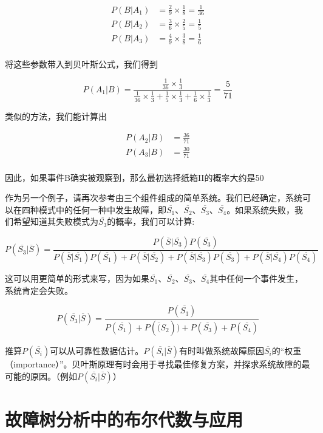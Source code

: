 \documentclass[cn,11pt,chinese]{elegantbook}
\begin{document}
\begin{align*}
P(B|A_1)&=\frac{2}{9}\times\frac{1}{8}=\frac{1}{36} \\
P(B|A_2)&=\frac{3}{6}\times\frac{2}{5}=\frac{1}{5}  \\
P(B|A_3)&=\frac{4}{9}\times\frac{3}{8}=\frac{1}{6}  \\
\end{align*}

将这些参数带入到贝叶斯公式，我们得到

$$
P(A_1|B)=\frac{\frac{1}{36}\times\frac{1}{3}}{\frac{1}{36}\times\frac{1}{3}+\frac{1}{5}\times\frac{1}{3}+\frac{1}{6}\times\frac{1}{3}}=\frac{5}{71}
$$

类似的方法，我们能计算出

\begin{align*}
P(A_2|B)&=\frac{36}{71} \\
P(A_3|B)&=\frac{30}{71} \\
\end{align*}

因此，如果事件B确实被观察到，那么最初选择纸箱II的概率大约是50%

作为另一个例子，请再次参考由三个组件组成的简单系统。我们已经确定，系统可以在四种模式中的任何一种中发生故障，即$\overline{S_1}$、$\overline{S_2}$、$\overline{S_3}$、$\overline{S_4}$。如果系统失败，我们希望知道其失败模式为$\overline{S_3}$的概率，我们可以计算:

$$P(\overline{S_3}|\overline{S}) = \frac{P(\overline{S}|\overline{S_3})P(\overline{S_3})}{P(\overline{S}|\overline{S_1})P(\overline{S_1})+P(\overline{S}|\overline{S_2})+P(\overline{S}|\overline{S_3})P(\overline{S_3})+P(\overline{S}|\overline{S_4})P(\overline{S_4})}
$$

这可以用更简单的形式来写，因为如果$\overline{S_1}$、$\overline{S_2}$、$\overline{S_3}$、$\overline{S_4}$其中任何一个事件发生，系统肯定会失败。

$$
P(\overline{S_3}|\overline{S})=\frac{P(\overline{S_3})}{P(\overline{S_1})+P(\overline(S_2))+P(\overline{S_3})+P(\overline{S_4})}
$$

推算$P(\overline{S_i})$可以从可靠性数据估计。$P(\overline{S_i}|\overline{S})$有时叫做系统故障原因$\overline{S_i}$的“权重（importance）”。贝叶斯原理有时会用于寻找最佳修复方案，并探求系统故障的最可能的原因。（例如$P(\overline{S_i}|\overline{S})$）

\chapter{故障树分析中的布尔代数与应用}
\end{document}
